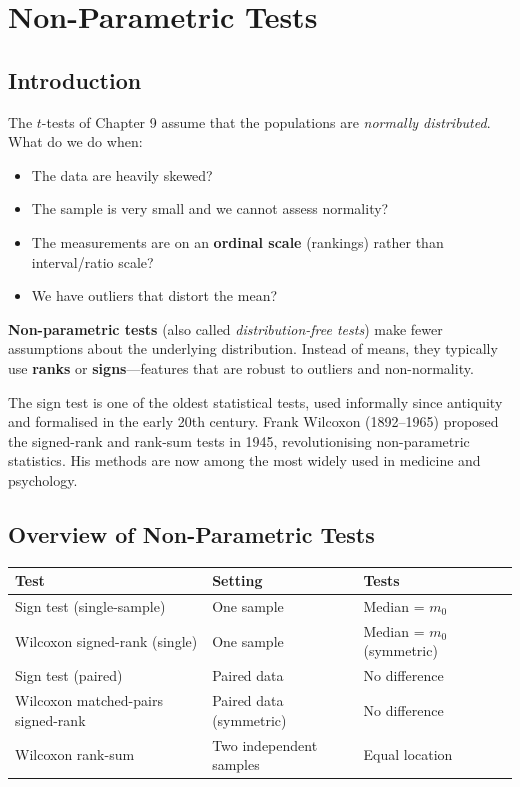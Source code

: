 \documentclass[12pt, a4paper, oneside]{book}
\theoremstyle{definition}
\theoremstyle{plain}
\theoremstyle{remark}
\begin{document}
\chapter{Non-Parametric Tests}
\label{ch:nonpar}

\section{Introduction}

The $t$-tests of Chapter 9 assume that the populations are \emph{normally
distributed}.  What do we do when:
\begin{itemize}
  \item The data are heavily skewed?
  \item The sample is very small and we cannot assess normality?
  \item The measurements are on an \textbf{ordinal scale} (rankings) rather
        than interval/ratio scale?
  \item We have outliers that distort the mean?
\end{itemize}

\textbf{Non-parametric tests} (also called \emph{distribution-free tests})
make fewer assumptions about the underlying distribution.  Instead of means,
they typically use \textbf{ranks} or \textbf{signs}---features that are
robust to outliers and non-normality.

\begin{historicalbox}
The sign test is one of the oldest statistical tests, used informally since
antiquity and formalised in the early 20th century.  Frank Wilcoxon (1892--1965)
proposed the signed-rank and rank-sum tests in 1945, revolutionising
non-parametric statistics.  His methods are now among the most widely used
in medicine and psychology.
\end{historicalbox}

\section{Overview of Non-Parametric Tests}
\label{sec:nonpar-overview}

\begin{center}
\begin{tabular}{lll}
\toprule
\textbf{Test} & \textbf{Setting} & \textbf{Tests} \\
\midrule
Sign test (single-sample)            & One sample            & Median = $m_0$ \\
Wilcoxon signed-rank (single)        & One sample            & Median = $m_0$ (symmetric) \\
Sign test (paired)                   & Paired data           & No difference \\
Wilcoxon matched-pairs signed-rank   & Paired data (symmetric) & No difference \\
Wilcoxon rank-sum                    & Two independent samples & Equal location \\
\bottomrule
\end{tabular}
\end{center}
\end{document}
